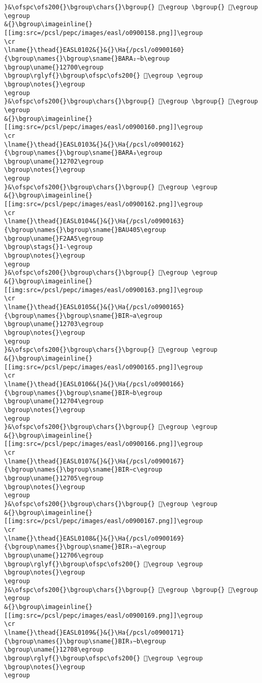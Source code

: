 \begin{verbatim}
}&\ofspc\ofs200{}\bgroup\chars{}\bgroup{} 𒛾\egroup \bgroup{} 𒛿\egroup \egroup
&{}\bgroup\imageinline{}[[img:src=/pcsl/pepc/images/easl/o0900158.png]]\egroup
\cr
\lname{}\thead{}EASL0102&{}&{}\Ha{/pcsl/o0900160}{\bgroup\names{}\bgroup\sname{}BARA₂∼b\egroup
\bgroup\uname{}12700\egroup
\bgroup\rglyf{}\bgroup\ofspc\ofs200{} 𒜀\egroup \egroup
\bgroup\notes{}\egroup
\egroup
}&\ofspc\ofs200{}\bgroup\chars{}\bgroup{} 𒜀\egroup \bgroup{} 𒜁\egroup \egroup
&{}\bgroup\imageinline{}[[img:src=/pcsl/pepc/images/easl/o0900160.png]]\egroup
\cr
\lname{}\thead{}EASL0103&{}&{}\Ha{/pcsl/o0900162}{\bgroup\names{}\bgroup\sname{}BARA₃\egroup
\bgroup\uname{}12702\egroup
\bgroup\notes{}\egroup
\egroup
}&\ofspc\ofs200{}\bgroup\chars{}\bgroup{} 𒜂\egroup \egroup
&{}\bgroup\imageinline{}[[img:src=/pcsl/pepc/images/easl/o0900162.png]]\egroup
\cr
\lname{}\thead{}EASL0104&{}&{}\Ha{/pcsl/o0900163}{\bgroup\names{}\bgroup\sname{}BAU405\egroup
\bgroup\uname{}F2AA5\egroup
\bgroup\stags{}1-\egroup
\bgroup\notes{}\egroup
\egroup
}&\ofspc\ofs200{}\bgroup\chars{}\bgroup{} 󲪥\egroup \egroup
&{}\bgroup\imageinline{}[[img:src=/pcsl/pepc/images/easl/o0900163.png]]\egroup
\cr
\lname{}\thead{}EASL0105&{}&{}\Ha{/pcsl/o0900165}{\bgroup\names{}\bgroup\sname{}BIR∼a\egroup
\bgroup\uname{}12703\egroup
\bgroup\notes{}\egroup
\egroup
}&\ofspc\ofs200{}\bgroup\chars{}\bgroup{} 𒜃\egroup \egroup
&{}\bgroup\imageinline{}[[img:src=/pcsl/pepc/images/easl/o0900165.png]]\egroup
\cr
\lname{}\thead{}EASL0106&{}&{}\Ha{/pcsl/o0900166}{\bgroup\names{}\bgroup\sname{}BIR∼b\egroup
\bgroup\uname{}12704\egroup
\bgroup\notes{}\egroup
\egroup
}&\ofspc\ofs200{}\bgroup\chars{}\bgroup{} 𒜄\egroup \egroup
&{}\bgroup\imageinline{}[[img:src=/pcsl/pepc/images/easl/o0900166.png]]\egroup
\cr
\lname{}\thead{}EASL0107&{}&{}\Ha{/pcsl/o0900167}{\bgroup\names{}\bgroup\sname{}BIR∼c\egroup
\bgroup\uname{}12705\egroup
\bgroup\notes{}\egroup
\egroup
}&\ofspc\ofs200{}\bgroup\chars{}\bgroup{} 𒜅\egroup \egroup
&{}\bgroup\imageinline{}[[img:src=/pcsl/pepc/images/easl/o0900167.png]]\egroup
\cr
\lname{}\thead{}EASL0108&{}&{}\Ha{/pcsl/o0900169}{\bgroup\names{}\bgroup\sname{}BIR₃∼a\egroup
\bgroup\uname{}12706\egroup
\bgroup\rglyf{}\bgroup\ofspc\ofs200{} 𒜆\egroup \egroup
\bgroup\notes{}\egroup
\egroup
}&\ofspc\ofs200{}\bgroup\chars{}\bgroup{} 𒜇\egroup \bgroup{} 𒜆\egroup \egroup
&{}\bgroup\imageinline{}[[img:src=/pcsl/pepc/images/easl/o0900169.png]]\egroup
\cr
\lname{}\thead{}EASL0109&{}&{}\Ha{/pcsl/o0900171}{\bgroup\names{}\bgroup\sname{}BIR₃∼b\egroup
\bgroup\uname{}12708\egroup
\bgroup\rglyf{}\bgroup\ofspc\ofs200{} 𒜈\egroup \egroup
\bgroup\notes{}\egroup
\egroup

\end{verbatim}
